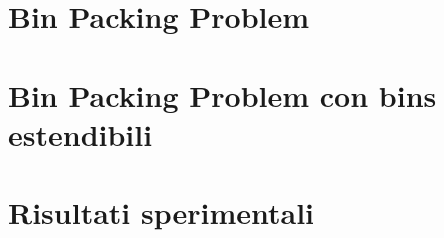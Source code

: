 \documentclass[a4paper]{report}
\begin{document}
\tableofcontents

\chapter{Bin Packing Problem}


\chapter{Bin Packing Problem con bins estendibili}


\chapter{Risultati sperimentali}


\printbibliography
\end{document}
